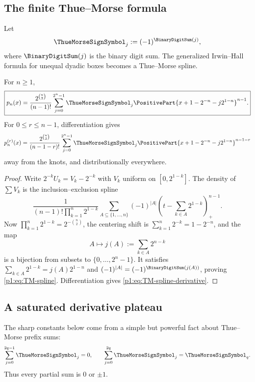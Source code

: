 \documentclass[11pt]{article}
\numberwithin{equation}{section}
\theoremstyle{definition}
\theoremstyle{remark}
\begin{document}
\subsection{The finite Thue--Morse formula}

Let
\begin{equation}
 \ThueMorseSignSymbol_j:=(-1)^{\BinaryDigitSum(j)},
 \label{p1:eq:TM-sign}
\end{equation}
where $\BinaryDigitSum(j)$ is the binary digit sum.  The generalized Irwin--Hall formula for unequal dyadic boxes becomes a Thue--Morse spline.

\begin{proposition}
\label{p1:prop:TM-spline}
For $n\ge1$,
\begin{equation}
 \boxed{
 p_n(x)=\frac{2^{\binom n2}}{(n-1)!}
 \sum_{j=0}^{2^n-1}\ThueMorseSignSymbol_j
 \PositivePart{x+1-2^{-n}-j2^{1-n}}^{n-1}.}
 \label{p1:eq:TM-spline}
\end{equation}
For $0\le r\le n-1$, differentiation gives
\begin{equation}
 p_n^{(r)}(x)=\frac{2^{\binom n2}}{(n-1-r)!}
 \sum_{j=0}^{2^n-1}\ThueMorseSignSymbol_j
 \PositivePart{x+1-2^{-n}-j2^{1-n}}^{n-1-r}
 \label{p1:eq:TM-spline-derivative}
\end{equation}
away from the knots, and distributionally everywhere.
\end{proposition}

\begin{proof}
Write $2^{-k}U_k=V_k-2^{-k}$ with $V_k$ uniform on $[0,2^{1-k}]$.  The density of $\sum V_k$ is the inclusion--exclusion spline
\[
 \frac1{(n-1)!\prod_{k=1}^n2^{1-k}}
 \sum_{A\subseteq\{1,\ldots,n\}}(-1)^{|A|}
 \left(t-\sum_{k\in A}2^{1-k}\right)_+^{n-1}.
\]
Now \(\prod_{k=1}^n2^{1-k}=2^{-\binom n2}\), the centering shift is
\(\sum_{k=1}^n2^{-k}=1-2^{-n}\), and the map
\[
 A\longmapsto j(A):=\sum_{k\in A}2^{n-k}
\]
is a bijection from subsets to $\{0,\ldots,2^n-1\}$.  It satisfies
\(\sum_{k\in A}2^{1-k}=j(A)2^{1-n}\) and
\((-1)^{|A|}=(-1)^{\BinaryDigitSum(j(A))}\), proving \eqref{p1:eq:TM-spline}.  Differentiation gives \eqref{p1:eq:TM-spline-derivative}.
\end{proof}

\subsection{A saturated derivative plateau}

The sharp constants below come from a simple but powerful fact about Thue--Morse prefix sums:
\begin{equation}
 \sum_{j=0}^{2q-1}\ThueMorseSignSymbol_j=0,
 \qquad
 \sum_{j=0}^{2q}\ThueMorseSignSymbol_j=\ThueMorseSignSymbol_q.
 \label{p1:eq:TM-prefix-two-valued}
\end{equation}
Thus every partial sum is $0$ or $\pm1$.
\end{document}
